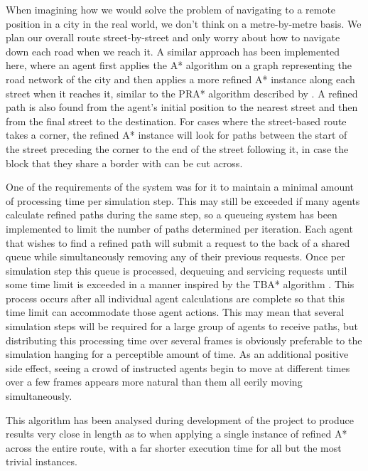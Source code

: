 \documentclass[a4paper,12pt]{article}
\begin{document}
When imagining how we would solve the problem of navigating to a remote position in a city in the real world, we don't think on a metre-by-metre basis. We plan our overall route street-by-street and only worry about how to navigate down each road when we reach it. A similar approach has been implemented here, where an agent first applies the A* algorithm on a graph representing the road network of the city and then applies a more refined A* instance along each street when it reaches it, similar to the PRA* algorithm described by . A refined path is also found from the agent's initial position to the nearest street and then from the final street to the destination. For cases where the street-based route takes a corner, the refined A* instance will look for paths between the start of the street preceding the corner to the end of the street following it, in case the block that they share a border with can be cut across.

One of the requirements of the system was for it to maintain a minimal amount of processing time per simulation step. This may still be exceeded if many agents calculate refined paths during the same step, so a queueing system has been implemented to limit the number of paths determined per iteration. Each agent that wishes to find a refined path will submit a request to the back of a shared queue while simultaneously removing any of their previous requests. Once per simulation step this queue is processed, dequeuing and servicing requests until some time limit is exceeded in a manner inspired by the TBA* algorithm \cite{bulitko10}. This process occurs after all individual agent calculations are complete so that this time limit can accommodate those agent actions. This may mean that several simulation steps will be required for a large group of agents to receive paths, but distributing this processing time over several frames is obviously preferable to the simulation hanging for a perceptible amount of time. As an additional positive side effect, seeing a crowd of instructed agents begin to move at different times over a few frames appears more natural than them all eerily moving simultaneously.

This algorithm has been analysed during development of the project to produce results very close in length as to when applying a single instance of refined A* across the entire route, with a far shorter execution time for all but the most trivial instances.
\end{document}

